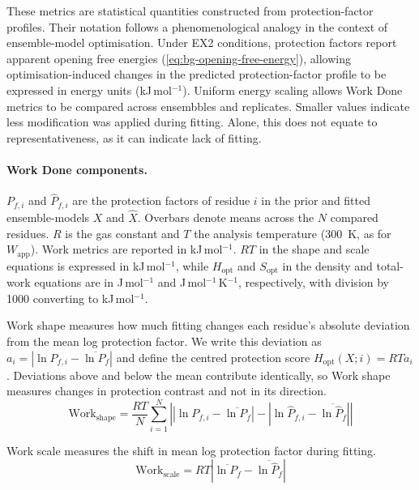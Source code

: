 These metrics are statistical quantities constructed from protection-factor profiles. Their notation follows a phenomenological analogy in the context of ensemble-model optimisation. Under EX2 conditions, protection factors report apparent opening free energies (\cref{eq:bg-opening-free-energy}), allowing optimisation-induced changes in the predicted protection-factor profile to be expressed in energy units (kJ\,mol$^{-1}$). Uniform energy scaling allows Work Done metrics to be compared across ensembbles and replicates. Smaller values indicate less modification was applied during fitting. Alone, this does not equate to representativeness, as it can indicate lack of fitting.

\paragraph{Work Done components.}
$P_{f,i}$ and $\hat P_{f,i}$ are the protection factors of residue $i$ in the prior and fitted ensemble-models $X$ and $\hat X$. Overbars denote means across the $N$ compared residues. $R$ is the gas constant and $T$ the analysis temperature (300~K, as for $W_\text{app}$). Work metrics are reported in kJ\,mol$^{-1}$. $RT$ in the shape and scale equations is expressed in kJ\,mol$^{-1}$, while $H_\text{opt}$ and $S_\text{opt}$ in the density and total-work equations are in J\,mol$^{-1}$ and J\,mol$^{-1}$\,K$^{-1}$, respectively, with division by 1000 converting to kJ\,mol$^{-1}$.

Work shape measures how much fitting changes each residue's absolute deviation from the mean log protection factor. We write this deviation as $a_i=|\ln P_{f,i}-\overline{\ln P_f}|$ and define the centred protection score $H_\text{opt}(X;i)=RTa_i$. Deviations above and below the mean contribute identically, so Work shape measures changes in protection contrast and not in its direction.
\begin{equation}
    \text{Work}_\text{shape}
    =\frac{RT}{N}\sum_{i=1}^{N}
    \left|
    \left|\ln P_{f,i}-\overline{\ln P_f}\right|
    -
    \left|\ln\hat P_{f,i}-\overline{\ln\hat P_f}\right|
    \right|
    \label{eq:valdx-work-shape}
\end{equation}

Work scale measures the shift in mean log protection factor during fitting.
\begin{equation}
    \text{Work}_\text{scale}=RT\left|\overline{\ln P_f}-\overline{\ln\hat P_f}\right|
    \label{eq:valdx-work-scale}
\end{equation}

